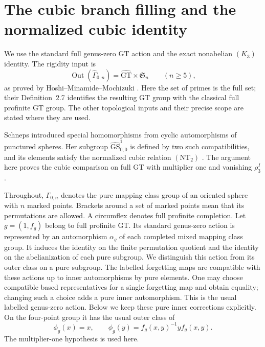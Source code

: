 \section{The cubic branch filling and the normalized cubic identity}
\label{sec:normalized-cubic-identity}

We use the standard full genus-zero GT action and the exact
nonabelian $(K_3)$ identity. The rigidity input is
\begin{equation}\label{eq:cubic-normalizer-1}
\operatorname{Out}(\widehat\Gamma_{0,n})
 =\widehat{\mathrm{GT}}\times\mathfrak S_n\qquad(n\ge5),
\end{equation}
as proved by Hoshi--Minamide--Mochizuki
\cite[Definition~2.7 and Corollary~2.8(i), author pp.~31--32]{CubicHMM}.
Here the set of primes is the full set; their Definition~2.7
identifies the resulting GT group with the classical full
profinite GT group. The other topological inputs and their
precise scope are stated where they are used.

Schneps introduced special homomorphisms from cyclic automorphisms
of punctured spheres. Her subgroup $\widehat{\mathrm{GS}}^1_{0,0}$
is defined by two such compatibilities, and its elements satisfy
the normalized cubic relation $(\mathrm{NT}_2)$
\cite[Definition~1.2, p.~658; Theorems~3.1 and~3.4,
pp.~665 and~667]{Schneps2006Special}.
The argument here proves the cubic comparison on full GT with
multiplier one and vanishing $\rho_3^I$.


Throughout, $\Gamma_{0,n}$ denotes the pure mapping class
group of an oriented sphere with $n$ marked points. Brackets
around a set of marked points mean that its permutations are
allowed. A circumflex denotes full profinite completion.
Let $g=(1,f_g)$ belong to full profinite GT. Its standard genus-zero
action \cite[equation~(1.3), p.~657]{Schneps2006Special}
is represented by an automorphism $\alpha_g$
of each completed mixed mapping class group. It induces the
identity on the finite permutation quotient and the identity
on the abelianization of each pure subgroup. We distinguish
this action from its outer class on a pure subgroup.
The labelled forgetting maps are compatible with these actions
up to inner automorphisms by pure elements. One may choose
compatible based representatives for a single forgetting map
and obtain equality; changing such a choice adds a pure inner
automorphism. This is the usual labelled genus-zero action.
Below we keep these
pure inner corrections explicitly. On the four-point group it
has the usual outer class of
\begin{equation}\label{eq:cubic-normalizer-2}
\phi_g(x)=x,\qquad
 \phi_g(y)=f_g(x,y)^{-1}y f_g(x,y).
\end{equation}
The multiplier-one hypothesis is used here.

